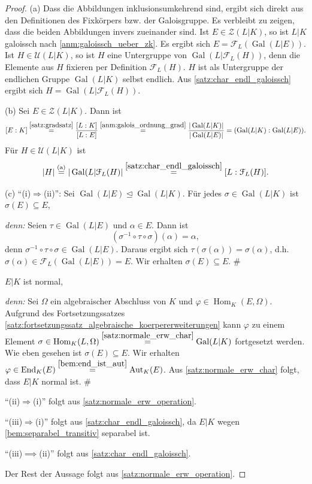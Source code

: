 \documentclass[a4paper, twoside, 11pt, ngerman]{report}
\newcommand{\calF}{\mathcal F}
\newcommand{\calU}{\mathcal U}
\newcommand{\calZ}{\mathcal Z}
\DeclareMathOperator{\Aut}{Aut}
\DeclareMathOperator{\End}{End}
\DeclareMathOperator{\Gal}{Gal}
\DeclareMathOperator{\Hom}{Hom}
\theoremstyle{definistyle}
\theoremstyle{remark}
\newenvironment{denn}%
  {\par\textit{denn:}}%
  {\hfill\#\par}
\begin{document}
\begin{proof}
(a) Dass die Abbildungen inklusionsumkehrend sind, ergibt sich direkt aus den Definitionen des Fixkörpers bzw. der Galoisgruppe. Es verbleibt zu zeigen, dass die beiden Abbildungen invers zueinander sind. Ist $E\in\calZ(L|K)$, so ist $L|K$ galoissch nach \ref{anm:galoissch_ueber_zk}. Es ergibt sich $E=\calF_L(\Gal(L|E))$. Ist $H \in \calU(L|K)$, so ist $H$ eine Untergruppe von $\Gal(L|\calF_L(H))$, denn die Elemente aus $H$ fixieren per Definition $\calF_L(H)$. $H$ ist als Untergruppe der endlichen Gruppe $\Gal(L|K)$ selbst endlich. Aus \ref{satz:char_endl_galoissch} ergibt sich $H=\Gal(L|\calF_L(H))$.

(b) Sei $E \in \calZ(L|K)$. Dann ist
\[
[E : K] \overset{\ref{satz:gradsatz}}{=} \frac{[L : K]}{[L : E]}\overset{\ref{anm:galois_ordnung_grad}}{=}\frac{|\Gal(L|K)|}{|\Gal(L|E)|}=(\Gal(L|K):\Gal(L|E)).
\]
Für $H\in\calU(L|K)$ ist
\[
|H|\overset{\text{(a)}}{=}|\Gal(L|\calF_L(H)|\overset{\ref{satz:char_endl_galoissch}}{=}[L:\calF_L(H)].
\]

(c) "`(i)$\Rightarrow$(ii)"': Sei $\Gal(L|E) \trianglelefteq \Gal(L|K)$. Für jedes $\sigma \in \Gal(L|K)$
ist $\sigma(E)\subseteq E$,
\begin{denn}
Seien $\tau \in \Gal(L|E)$  und $\alpha \in E$. Dann ist
\[
(\sigma^{-1} \circ \tau \circ \sigma)(\alpha) = \alpha,
\]
denn $\sigma^{-1} \circ \tau \circ \sigma\in\Gal(L|E)$.
Daraus ergibt sich $\tau(\sigma(\alpha)) = \sigma(\alpha)$, d.h. $\sigma(\alpha) \in \calF_L(\Gal(L|E)) = E$.
Wir erhalten $\sigma(E) \subseteq E$.
\end{denn}
$E|K$ ist normal,
\begin{denn}
Sei $\Omega$ ein algebraischer Abschluss von $K$ und $\varphi\in \Hom_K(E, \Omega)$.
Aufgrund des Fortsetzungssatzes \ref{satz:fortsetzungssatz_algebraische_koerpererweiterungen} kann $\varphi$
zu einem Element $\sigma\in\Hom_K(L,\Omega)\overset{\ref{satz:normale_erw_char}}{=}\Gal(L|K)$ fortgesetzt werden. Wie eben gesehen ist $\sigma(E)\subseteq E$. Wir erhalten $\varphi\in\End_K(E)\overset{\ref{bem:end_ist_aut}}{=}\Aut_K(E)$.
Aus \ref{satz:normale_erw_char} folgt, dass $E|K$ normal ist.
\end{denn}
"`(ii)$\Rightarrow$(i)"' folgt aus \ref{satz:normale_erw_operation}.

"`(iii)$\Rightarrow$(i)"' folgt aus \ref{satz:char_endl_galoissch}, da $E|K$ wegen \ref{bem:separabel_transitiv}
separabel ist.

"`(iii)$\implies$(ii)"' folgt aus \ref{satz:char_endl_galoissch}.

Der Rest der Aussage folgt aus \ref{satz:normale_erw_operation}.
\end{proof}
\end{document}
